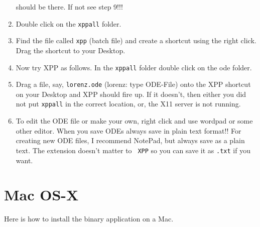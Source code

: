 \documentclass{article}
\begin{document}
\begin{enumerate}
should be there. If not see step 9!!!
\item Double click on the {\tt xppall} folder.
\item Find the file called {\tt xpp} (batch file) and create a
shortcut using the right click. Drag the shortcut to your Desktop.
\item Now try XPP as follows.  In the {\tt xppall} folder double click
on the ode folder.
\item  Drag a file, say, {\tt lorenz.ode}  (lorenz: type ODE-File)
onto the XPP shortcut on your Desktop and XPP should fire up. If it
doesn't, then either you did not put {\tt xppall} in the correct
location, or, the X11 server is not running.
\item To edit the ODE file or make your own, right click and use
wordpad or some other editor. When you save ODEs always save in plain
text format!! For creating new ODE files, I recommend NotePad, but
always save as a plain text.  The extension doesn't matter to {\tt
XPP} so you can save it as {\tt .txt} if you want.
\end{enumerate}


\section{Mac OS-X}
Here is how to install the binary application on a Mac.
\end{document}
